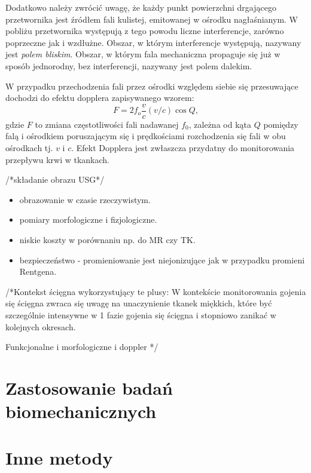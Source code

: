 Dodatkowo należy zwrócić uwagę, że każdy punkt powierzchni drgającego przetwornika jest źródłem fali kulistej, emitowanej w ośrodku nagłaśnianym. W pobliżu przetwornika występują z tego powodu liczne interferencje, zarówno poprzeczne jak i wzdłużne. Obszar, w którym interferencje występują, nazywany jest \textit{polem bliskim}. Obszar, w którym fala mechaniczna propaguje się już w sposób jednorodny, bez interferencji, nazywany jest polem dalekim. 

W przypadku przechodzenia fali przez ośrodki względem siebie się przesuwające dochodzi do efektu dopplera zapisywanego wzorem:
\begin{equation}
F = 2 f_o\frac{v}{c}(v/c)\cos{Q},
\end{equation} 
gdzie $F$ to zmiana częstotliwości fali nadawanej $f_0$, zależna od kąta $Q$ pomiędzy falą i ośrodkiem poruszającym się i prędkościami rozchodzenia się fali w obu ośrodkach tj. $v$ i $c$. Efekt Dopplera jest zwłaszcza przydatny do monitorowania przepływu krwi w tkankach.

/*składanie obrazu USG*/
\begin{itemize}
	\item obrazowanie w czasie rzeczywistym.
	\item pomiary morfologiczne i fizjologiczne.
	\item niskie koszty w porównaniu np. do MR czy TK.
	\item bezpieczeństwo - promieniowanie jest niejonizujące jak w przypadku promieni Rentgena.
\end{itemize}

/*Kontekst ścięgna wykorzystujący te plusy:
W kontekście monitorowania gojenia się ścięgna zwraca się uwagę na unaczynienie tkanek miękkich, które być szczególnie intensywne w 1 fazie gojenia się ścięgna i stopniowo zanikać w kolejnych okresach.

Funkcjonalne i morfologiczne i doppler
*/

\section{Zastosowanie badań biomechanicznych}
\section{Inne metody}